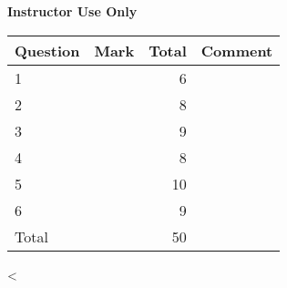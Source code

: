 \documentclass[12pt,legalpaper]{exam}
\begin{document}
\begin{center}
    {\bf Instructor Use Only}\\
    \vspace{.5cm}
    \begin{tabular}{|l|l|r|l|}
        \hline
        Question & Mark & Total & Comment\\
        \hline
        1 & & 6  & \\ \hline
        2 & & 8  & \\ \hline
        3 & & 9  & \\ \hline
        4 & & 8  & \\ \hline
        5 & & 10 & \\ \hline
        6 & & 9  & \\ \hline
        \hline
        Total & & 50 &\\
        \hline
    \end{tabular}
\end{center}

\begin{questions}
    <%
\end{questions}
\end{document}
